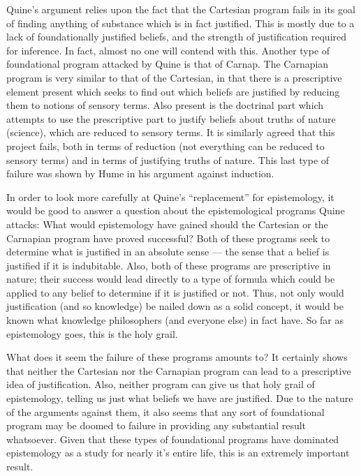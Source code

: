 \documentclass[12pt,letterpaper]{report}
\begin{document}
Quine's argument relies upon the fact that the Cartesian program fails in its goal of finding anything of substance which is in fact justified. This is mostly due to a lack of foundationally justified beliefs, and the strength of justification required for inference. In fact, almost no one will contend with this. Another type of foundational program attacked by Quine is that of Carnap. The Carnapian program is very similar to that of the Cartesian, in that there is a prescriptive element present which seeks to find out which beliefs are justified by reducing them to notions of sensory terms. Also present is the doctrinal part which attempts to use the prescriptive part to justify beliefs about truths of nature (science), which are reduced to sensory terms. It is similarly agreed that this project fails, both in terms of reduction (not everything can be reduced to sensory terms) and in terms of justifying truths of nature. This last type of failure was shown by Hume in his argument against induction.

In order to look more carefully at Quine's ``replacement'' for epistemology, it would be good to answer a question about the epistemological programs Quine attacks: What would epistemology have gained should the Cartesian or the Carnapian program have proved successful? Both of these programs seek to determine what is justified in an absolute sense --- the sense that a belief is justified if it is indubitable. Also, both of these programs are prescriptive in nature; their success would lead directly to a type of formula which could be applied to any belief to determine if it is justified or not. Thus, not only would justification (and so knowledge) be nailed down as a solid concept, it would be known what knowledge philosophers (and everyone else) in fact have. So far as epistemology goes, this is the holy grail.

What does it seem the failure of these programs amounts to? It certainly shows that neither the Cartesian nor the Carnapian program can lead to a prescriptive idea of justification. Also, neither program can give us that holy grail of epistemology, telling us just what beliefs we have are justified. Due to the nature of the arguments against them, it also seems that any sort of foundational program may be doomed to failure in providing any substantial result whatsoever. Given that these types of foundational programs  have dominated epistemology as a study for nearly it's entire life, this is an extremely important result.
\end{document}
